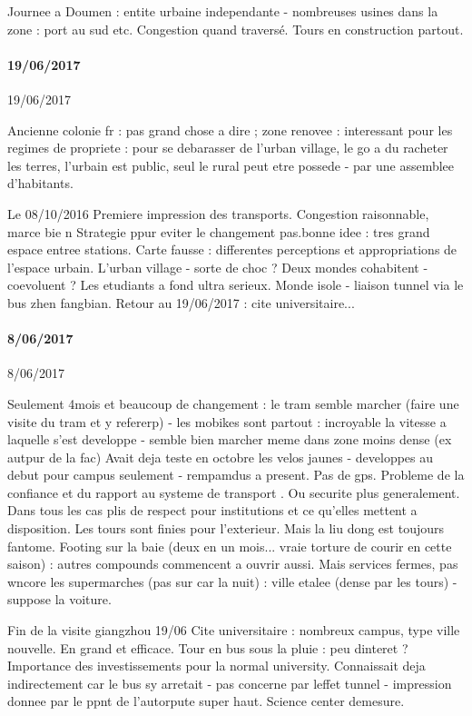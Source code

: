 Journee a Doumen : entite urbaine independante - nombreuses usines dans la zone : port au sud etc. Congestion quand traversé. Tours en construction partout.

\paragraph{19/06/2017}{19/06/2017}

Ancienne colonie fr : pas grand chose a dire ; zone renovee : interessant pour les regimes de propriete : pour se debarasser de l'urban village, le go a du racheter les terres, l'urbain est public, seul le rural peut etre possede - par une assemblee d'habitants.

Le 08/10/2016
Premiere impression des transports. Congestion raisonnable, marce bie
n
Strategie ppur eviter le changement pas.bonne idee : tres grand espace entree stations. Carte fausse : differentes perceptions et appropriations de l'espace urbain. L'urban village - sorte de choc ?
Deux mondes cohabitent - coevoluent ? Les etudiants a fond ultra serieux. Monde isole - liaison tunnel via le bus zhen fangbian.
Retour au 19/06/2017 : cite universitaire...


\paragraph{8/06/2017}{8/06/2017}


Seulement 4mois et beaucoup de changement : le tram semble marcher (faire une visite du tram et y refererp) - les mobikes sont partout : incroyable la vitesse a laquelle s'est developpe - semble bien marcher meme dans zone moins dense (ex autpur de la fac)
Avait deja teste en octobre les velos jaunes - developpes au debut pour campus seulement - rempamdus a present. Pas de gps. Probleme de la confiance et du rapport au systeme de transport . Ou securite plus generalement. Dans tous les cas plis de respect pour institutions et ce qu'elles mettent a disposition. Les tours sont finies pour l'exterieur. Mais la liu dong est toujours fantome.
Footing sur la baie (deux en un mois... vraie torture de courir en cette saison) : autres compounds commencent a ouvrir aussi. Mais services fermes, pas wncore les supermarches (pas sur car la nuit) : ville etalee (dense par les tours) - suppose la voiture.

Fin de la visite giangzhou 19/06
Cite universitaire : nombreux campus, type ville nouvelle. En grand et efficace. Tour en bus sous la pluie : peu dinteret ? Importance des investissements pour la normal university.
Connaissait deja indirectement car le bus sy arretait - pas concerne par leffet tunnel - impression donnee par le ppnt de l'autorpute super haut. Science center demesure.

